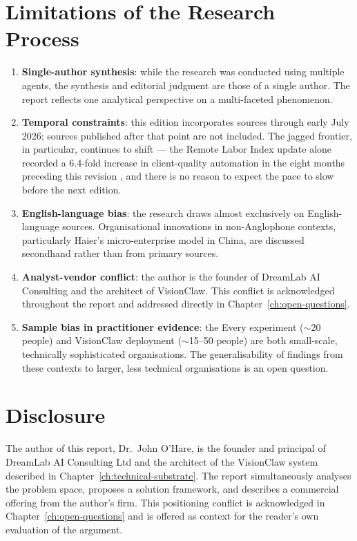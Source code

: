 \section{Limitations of the Research Process}

\begin{enumerate}
  \item \textbf{Single-author synthesis}: while the research was conducted using multiple agents, the synthesis and editorial judgment are those of a single author. The report reflects one analytical perspective on a multi-faceted phenomenon.
  \item \textbf{Temporal constraints}: this edition incorporates sources through early July 2026; sources published after that point are not included. The jagged frontier, in particular, continues to shift --- the Remote Labor Index update alone recorded a 6.4-fold increase in client-quality automation in the eight months preceding this revision \parencite{CAIS2026RLI}, and there is no reason to expect the pace to slow before the next edition.
  \item \textbf{English-language bias}: the research draws almost exclusively on English-language sources. Organisational innovations in non-Anglophone contexts, particularly Haier's micro-enterprise model in China, are discussed secondhand rather than from primary sources.
  \item \textbf{Analyst-vendor conflict}: the author is the founder of DreamLab AI Consulting and the architect of VisionClaw. This conflict is acknowledged throughout the report and addressed directly in Chapter~\ref{ch:open-questions}.
  \item \textbf{Sample bias in practitioner evidence}: the Every experiment ($\sim$20 people) and VisionClaw deployment ($\sim$15--50 people) are both small-scale, technically sophisticated organisations. The generalisability of findings from these contexts to larger, less technical organisations is an open question.
\end{enumerate}

\section{Disclosure}

The author of this report, Dr.\ John O'Hare, is the founder and principal of DreamLab AI Consulting Ltd and the architect of the VisionClaw system described in Chapter~\ref{ch:technical-substrate}. The report simultaneously analyses the problem space, proposes a solution framework, and describes a commercial offering from the author's firm. This positioning conflict is acknowledged in Chapter~\ref{ch:open-questions} and is offered as context for the reader's own evaluation of the argument.
